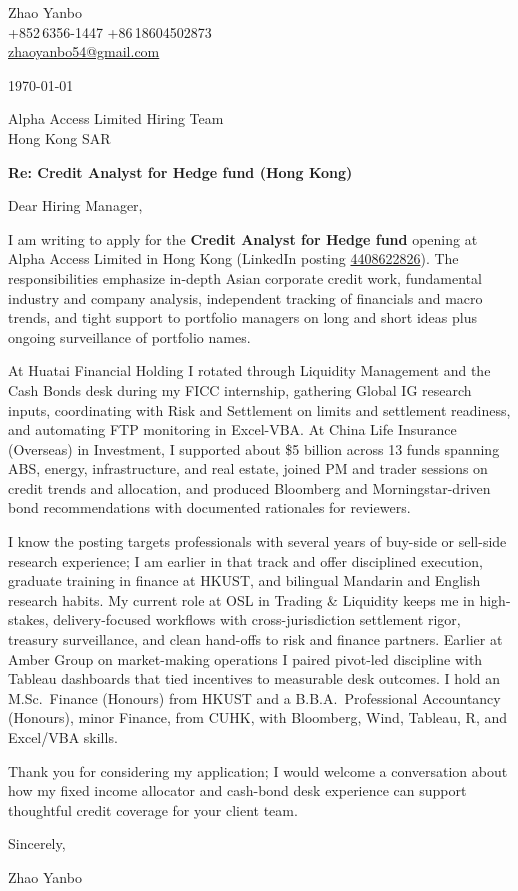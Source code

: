 \documentclass[10pt,a4paper]{article}
\begin{document}
\begin{flushleft}
  Zhao Yanbo\\
  +852\,6356-1447 \;\textbar\; +86\,18604502873\\
  \href{mailto:zhaoyanbo54@gmail.com}{zhaoyanbo54@gmail.com}
\end{flushleft}

\vspace{1em}

\begin{flushright}
  \today
\end{flushright}

\vspace{0.75em}

Alpha Access Limited Hiring Team\\
Hong Kong SAR

\vspace{1em}

\textbf{Re: Credit Analyst for Hedge fund (Hong Kong)}

\vspace{0.75em}

Dear Hiring Manager,

I am writing to apply for the \textbf{Credit Analyst for Hedge fund} opening at Alpha Access Limited in Hong Kong (LinkedIn posting \href{https://www.linkedin.com/jobs/view/4408622826/}{4408622826}). The responsibilities emphasize in-depth Asian corporate credit work, fundamental industry and company analysis, independent tracking of financials and macro trends, and tight support to portfolio managers on long and short ideas plus ongoing surveillance of portfolio names.

At Huatai Financial Holding I rotated through Liquidity Management and the Cash Bonds desk during my FICC internship, gathering Global IG research inputs, coordinating with Risk and Settlement on limits and settlement readiness, and automating FTP monitoring in Excel-VBA. At China Life Insurance (Overseas) in Investment, I supported about \$5 billion across 13 funds spanning ABS, energy, infrastructure, and real estate, joined PM and trader sessions on credit trends and allocation, and produced Bloomberg and Morningstar-driven bond recommendations with documented rationales for reviewers.

I know the posting targets professionals with several years of buy-side or sell-side research experience; I am earlier in that track and offer disciplined execution, graduate training in finance at HKUST, and bilingual Mandarin and English research habits. My current role at OSL in Trading \& Liquidity keeps me in high-stakes, delivery-focused workflows with cross-jurisdiction settlement rigor, treasury surveillance, and clean hand-offs to risk and finance partners. Earlier at Amber Group on market-making operations I paired pivot-led discipline with Tableau dashboards that tied incentives to measurable desk outcomes. I hold an M.Sc.\ Finance (Honours) from HKUST and a B.B.A.\ Professional Accountancy (Honours), minor Finance, from CUHK, with Bloomberg, Wind, Tableau, R, and Excel/VBA skills.

Thank you for considering my application; I would welcome a conversation about how my fixed income allocator and cash-bond desk experience can support thoughtful credit coverage for your client team.

\vspace{1em}

Sincerely,

\vspace{2em}

Zhao Yanbo
\end{document}
